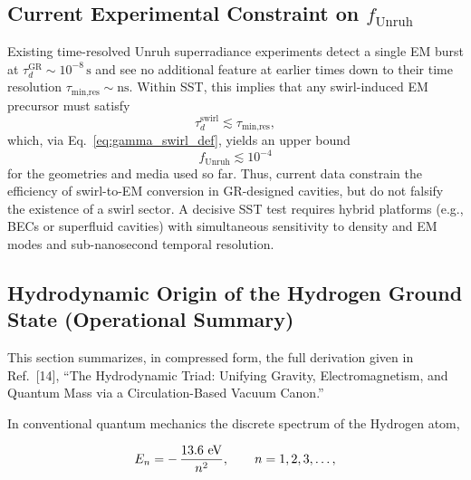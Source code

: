 \documentclass[10pt,reprint,aps,onecolumn,nofootinbib]{revtex4-2}
\begin{document}
    \subsection{Current Experimental Constraint on $f_{\text{Unruh}}$}

        Existing time-resolved Unruh superradiance experiments
        \cite{Lochan2020,WangBlencowe2021,Deswal2025,Zheng2025,Saha2025} detect a
        single EM burst at $\tau_d^{\text{GR}}\sim10^{-8}\,\mathrm{s}$ and see no
        additional feature at earlier times down to their time resolution
        $\tau_{\text{min,res}}\sim \mathrm{ns}$. Within SST, this implies that any
        swirl-induced EM precursor must satisfy
        \begin{equation}
            \tau_d^{\text{swirl}} \lesssim \tau_{\text{min,res}},
        \end{equation}
        which, via Eq.~\eqref{eq:gamma_swirl_def}, yields an upper bound
        \begin{equation}
            f_{\text{Unruh}} \lesssim 10^{-4}
        \end{equation}
        for the geometries and media used so far. Thus, current data constrain the
        efficiency of swirl-to-EM conversion in GR-designed cavities, but do not
        falsify the existence of a swirl sector. A decisive SST test requires
        hybrid platforms (e.g., BECs or superfluid cavities) with simultaneous
        sensitivity to density and EM modes \cite{Steinhauer2016,Gooding2020} and
        sub-nanosecond temporal resolution.

    \subsection{Hydrodynamic Origin of the Hydrogen Ground State (Operational Summary)}
        \label{sec:SST_hydrogen_groundstate}

        This section summarizes, in compressed form, the full derivation given in Ref.~[14], ``The Hydrodynamic Triad: Unifying Gravity, Electromagnetism, and Quantum Mass via a Circulation-Based Vacuum Canon.''

        In conventional quantum mechanics the discrete spectrum of the Hydrogen
        atom,

        \begin{equation}
            E_n = -\,\frac{13.6~{\rm eV}}{n^2},
            \qquad n=1,2,3,\ldots,
        \end{equation}
\end{document}
